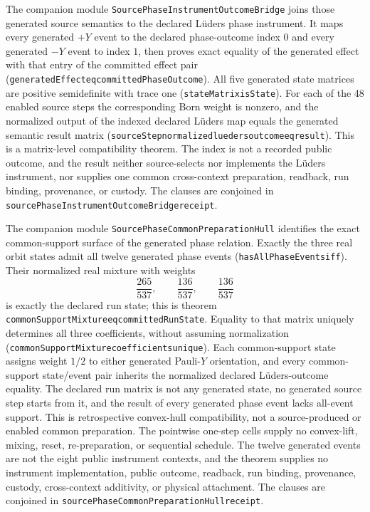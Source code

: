 \documentclass[11pt]{article}
\renewcommand{\_}{\textunderscore\allowbreak}
\theoremstyle{remark}
\begin{document}
The companion module
\texttt{SourcePhaseInstrumentOutcomeBridge} joins those generated source
semantics to the declared L\"uders phase instrument. It maps every
generated $+Y$ event to the declared phase-outcome index $0$ and every
generated $-Y$ event to index $1$, then proves exact equality of the generated
effect with that entry of the committed effect pair
(\texttt{generatedEffect\_eq\_committedPhaseOutcome}). All five generated
state matrices are positive semidefinite with trace one
(\texttt{stateMatrix\_isState}). For each of the 48
enabled source steps the corresponding Born weight is nonzero, and the
normalized output of the indexed declared L\"uders map equals the generated
semantic result matrix
(\texttt{sourceStep\_normalized\_lueders\_outcome\_eq\_result}). This is a
matrix-level compatibility theorem. The index is not a recorded public
outcome, and the result neither source-selects nor implements the L\"uders
instrument, nor supplies one common cross-context preparation, readback, run
binding, provenance, or custody. The clauses are conjoined in
\texttt{sourcePhaseInstrumentOutcomeBridge\_receipt}.

The companion module \texttt{SourcePhaseCommonPreparationHull} identifies
the exact common-support surface of the generated phase relation. Exactly the
three real orbit states admit all twelve generated phase events
(\texttt{hasAllPhaseEvents\_iff}). Their normalized real mixture with weights
\[
  \frac{265}{537},\qquad \frac{136}{537},\qquad \frac{136}{537}
\]
is exactly the declared run state; this is theorem
\texttt{commonSupportMixture\_eq\_committedRunState}. Equality to that matrix
uniquely determines all three coefficients, without assuming normalization
(\texttt{commonSupportMixture\_coefficients\_unique}). Each common-support
state assigns weight $1/2$ to either generated Pauli-$Y$ orientation, and
every common-support state/event pair inherits the normalized declared
L\"uders-outcome equality. The declared run matrix is not any generated state,
no generated source step starts from it, and the result of every generated
phase event lacks all-event support. This is retrospective convex-hull
compatibility, not a source-produced or enabled common preparation. The
pointwise one-step cells supply no convex-lift, mixing, reset,
re-preparation, or sequential schedule. The twelve generated events are not
the eight public instrument contexts, and the theorem supplies no instrument
implementation, public outcome, readback, run binding, provenance, custody,
cross-context additivity, or physical attachment. The
clauses are conjoined in
\texttt{sourcePhaseCommonPreparationHull\_receipt}.
\end{document}
